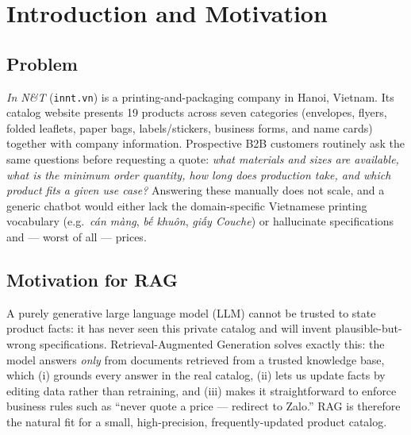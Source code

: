 \section{Introduction and Motivation}
\label{sec:intro}

\subsection{Problem}
\textit{In N\&T} (\texttt{innt.vn}) is a printing-and-packaging company in Hanoi,
Vietnam. Its catalog website presents 19 products across seven categories
(envelopes, flyers, folded leaflets, paper bags, labels/stickers, business
forms, and name cards) together with company information. Prospective B2B
customers routinely ask the same questions before requesting a quote: \emph{what
materials and sizes are available, what is the minimum order quantity, how long
does production take, and which product fits a given use case?} Answering these
manually does not scale, and a generic chatbot would either lack the
domain-specific Vietnamese printing vocabulary (e.g.\ \textit{cán màng},
\textit{bế khuôn}, \textit{giấy Couche}) or hallucinate specifications
and --- worst of all --- prices.

\subsection{Motivation for RAG}
A purely generative large language model (LLM) cannot be trusted to state
product facts: it has never seen this private catalog and will invent
plausible-but-wrong specifications. Retrieval-Augmented Generation
\cite{lewis2020rag} solves exactly this: the model answers \emph{only} from
documents retrieved from a trusted knowledge base, which (i) grounds every
answer in the real catalog, (ii) lets us update facts by editing data rather
than retraining, and (iii) makes it straightforward to enforce business rules
such as ``never quote a price --- redirect to Zalo.'' RAG is therefore the
natural fit for a small, high-precision, frequently-updated product catalog.

